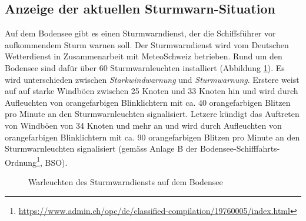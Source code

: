 \subsection{Anzeige der aktuellen Sturmwarn-Situation}
\label{subsec:sturmwarnung}

Auf dem Bodensee gibt es einen Sturmwarndienst, der die Schiffsführer vor aufkommendem Sturm warnen soll. Der Sturmwarndienst wird vom Deutschen Wetterdienst in Zusammenarbeit mit MeteoSchweiz betrieben. Rund um den Bodensee sind dafür über 60 Sturmwarnleuchten installiert (Abbildung \ref{img:sturm2}). Es wird unterschieden zwischen \textit{Starkwindwarnung} und \textit{Sturmwarnung}. Erstere weist auf auf starke Windböen zwischen 25 Knoten und 33 Knoten hin und wird durch Aufleuchten von orangefarbigen Blinklichtern mit ca. 40 orangefarbigen Blitzen pro Minute an den Sturmwarnleuchten signalisiert. Letzere kündigt das Auftreten von Windböen von 34 Knoten und mehr an und wird durch Aufleuchten von orangefarbigen Blinklichtern mit ca. 90 orangefarbigen Blitzen pro Minute an den Sturmwarnleuchten signalisiert (gemäss Anlage B der Bodensee-Schifffahrts-Ordnung\footnote{ \url{https://www.admin.ch/opc/de/classified-compilation/19760005/index.html}}, BSO).

\begin{figure}[htbp!]
	\centering
	\caption{Warleuchten des Sturmwarndiensts auf dem Bodensee}
	\label{img:sturm2}
\end{figure}



